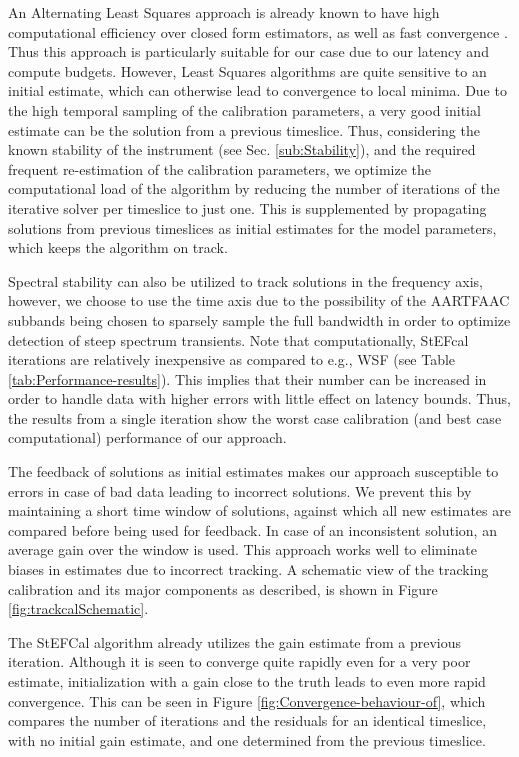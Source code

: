 \documentclass{aa}
\begin{document}
An  Alternating   Least  Squares  approach   is  already  known  to   have  high
computational  efficiency   over  closed  form  estimators,  as   well  as  fast
convergence  \citep{boonstra2003gain}.   Thus   this  approach  is  particularly
suitable for  our case due to  our latency and compute  budgets.  However, Least
Squares  algorithms  are quite  sensitive  to  an  initial estimate,  which  can
otherwise lead to convergence to local minima. Due to the high temporal sampling
of the calibration parameters, a very  good initial estimate can be the solution
from  a  previous timeslice.   Thus,  considering  the  known stability  of  the
instrument   (see  Sec.    \ref{sub:Stability}),  and   the   required  frequent
re-estimation of the calibration  parameters, we optimize the computational load
of the  algorithm by reducing the  number of iterations of  the iterative solver
per timeslice  to just one. This  is supplemented by  propagating solutions from
previous timeslices as  initial estimates for the model  parameters, which keeps
the  algorithm on  track. 

Spectral  stability can also  be utilized  to track  solutions in  the frequency
axis, however,  we choose to  use the  time axis due  to the possibility  of the
AARTFAAC subbands being chosen to sparsely sample the full bandwidth in order to
optimize  detection of  steep spectrum  transients.  Note  that computationally,
StEFcal  iterations are  relatively inexpensive  as compared  to e.g.,  WSF (see
Table  \ref{tab:Performance-results}).  This  implies that  their number  can be
increased  in order  to handle  data with  higher errors  with little  effect on
latency bounds.  Thus,  the results from a single iteration  show the worst case
calibration (and best case computational) performance of our approach.

The feedback of solutions as initial estimates makes our approach susceptible to
errors in case  of bad data leading to incorrect solutions.   We prevent this by
maintaining a  short time window of  solutions, against which  all new estimates
are  compared  before being  used  for feedback.   In  case  of an  inconsistent
solution, an average gain over the  window is used.  This approach works well to
eliminate biases in estimates due to incorrect tracking. A schematic view of the
tracking calibration and  its major components as described,  is shown in Figure
\ref{fig:trackcalSchematic}.

The  StEFCal  algorithm already  utilizes  the  gain  estimate from  a  previous
iteration. Although  it is seen to converge  quite rapidly even for  a very poor
estimate, initialization with a gain close to the truth leads to even more rapid
convergence.   This can  be seen  in  Figure \ref{fig:Convergence-behaviour-of},
which  compares the  number of  iterations and  the residuals  for  an identical
timeslice, with no  initial gain estimate, and one  determined from the previous
timeslice.
\end{document}
